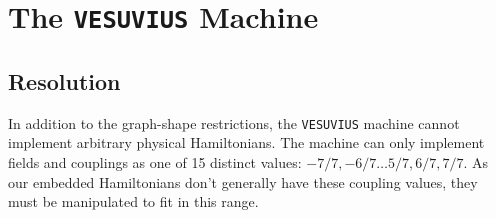 \chapter{The \texttt{VESUVIUS} Machine}

\section{Resolution}
In addition to the graph-shape restrictions, the \texttt{VESUVIUS} machine cannot implement arbitrary physical Hamiltonians.  The machine can only implement fields and couplings as one of 15 distinct values: $-7/7, -6/7 \dots 5/7,6/7, 7/7$.  As our embedded Hamiltonians don't generally have these coupling values, they must be manipulated to fit in this range.
